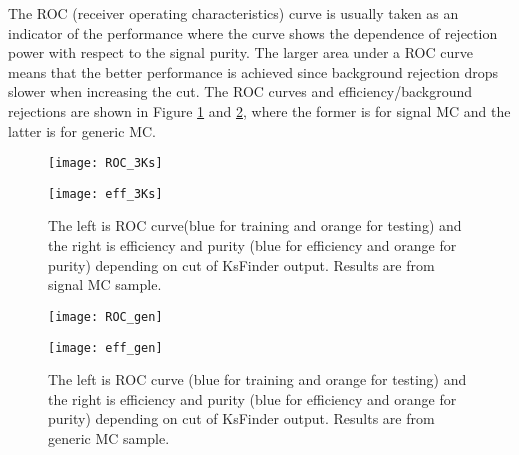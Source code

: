 The ROC (receiver operating characteristics) curve is usually taken as an indicator of the performance where the curve shows the dependence of rejection power with respect to the signal purity. The larger area under a ROC curve means that the better performance is achieved since background rejection drops slower when increasing the cut. The ROC curves and efficiency/background rejections are shown in Figure \ref{fig:3Ks_performance} and \ref{fig:gen_performance}, where the former is for signal MC and the latter is for generic MC.

\begin{figure}[H]
	\begin{minipage}[b]{0.5\linewidth}
		\centering 
		\texttt{[image: ROC\_3Ks]}
		\label{fig:ROC_3Ks}
	\end{minipage}
	\begin{minipage}[b]{0.5\linewidth}
		\centering 
		\texttt{[image: eff\_3Ks]}
		\label{fig:eff_3Ks}
	\end{minipage}
\caption{The left is ROC curve(blue for training and orange for testing) and the right is efficiency and purity (blue for efficiency and orange for purity) depending on cut of KsFinder output. Results are from signal MC sample.}
\label{fig:3Ks_performance}
\end{figure}

\begin{figure}[H]
	\begin{minipage}[b]{0.5\linewidth}
		\centering 
		\texttt{[image: ROC\_gen]}
	\end{minipage}
	\begin{minipage}[b]{0.5\linewidth}
		\centering 
		\texttt{[image: eff\_gen]}
	\end{minipage}
	\caption{The left is ROC curve (blue for training and orange for testing) and the right is efficiency and purity (blue for efficiency and orange for purity) depending on cut of KsFinder output. Results are from generic MC sample.}
	\label{fig:gen_performance}
\end{figure}

\begin{comment}
\begin{figure}[H]
	\begin{minipage}[b]{0.5\linewidth}
		\centering 
		\texttt{[image: jpsi-jpsi]}
		\label{fig:side:a}
	\end{minipage}
	\begin{minipage}[b]{0.5\linewidth}
		\centering 
		\texttt{[image: jpsi-jpsi-pur]}
		\label{fig:side:b}
	\end{minipage}
	\caption{The left is ROC curve and the right is efficiency and purity depending on cut of classifier output. Results are from $B^0 \to J/\psi K_S^0$ generic decay sample.}
\end{figure}
\end{comment}

